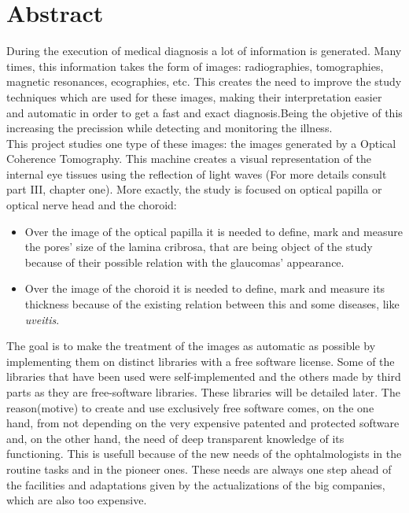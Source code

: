 \section*{Abstract}
During the execution of medical diagnosis a lot of information is generated.
Many times, this information takes the form of images:
radiographies, tomographies, magnetic resonances, ecographies, etc.
This creates the need to improve the study techniques which are used for these images,
making their interpretation easier and automatic in order to
get a fast and exact diagnosis.Being the objetive of this increasing the 
precission while detecting and monitoring the illness.\\
This project studies one type of these images: the images generated
by a Optical Coherence Tomography. This machine creates a visual
representation of the internal eye tissues using the reflection of 
light waves (For more details consult part III, chapter one). More
exactly, the study is focused on optical papilla or optical nerve head
and the choroid:
\begin{itemize}
\item Over the image of the optical papilla it is needed to define, mark and measure
  the pores' size of the lamina cribrosa, that are being object of the
  study because of their possible relation with the \gls{glaucoma}s' 
  appearance.
\item Over the image of the choroid it is needed to define, mark and measure its
  thickness because of the existing relation between this and some diseases,
  like \emph{\gls{uveitis}}.
\end{itemize}
The goal is to make the treatment of the images as automatic as possible 
by implementing them on distinct libraries with a free software
license. Some of the libraries that have been used were self-implemented and the others
made by third parts as they are free-software libraries. These
libraries will be detailed later. The reason(motive) to create and use exclusively
free software comes, on the one hand, from not depending on the very expensive patented and protected software
and, on the other hand, 
the need of deep transparent knowledge of its functioning. This is
usefull because of the new needs of the ophtalmologists in the 
routine tasks and in the pioneer ones. These needs are always one step
ahead of the facilities and adaptations given by the actualizations
of the big companies, which are also too expensive.